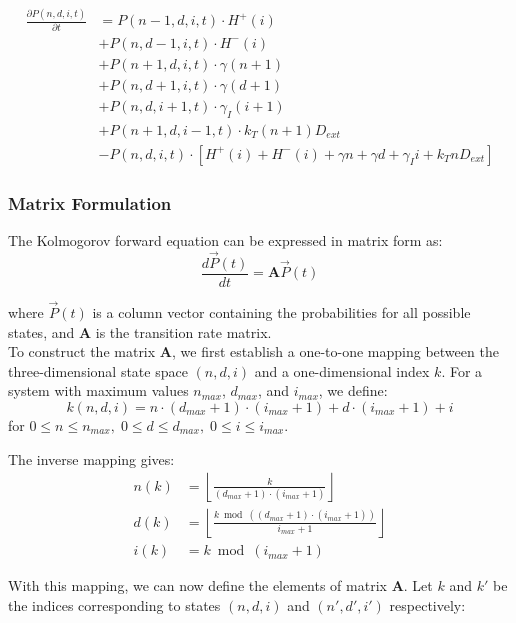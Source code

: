 \documentclass{article}
\begin{document}
\begin{flushleft}
\begin{align*}
\frac{\partial P(n,d,i,t)}{\partial t} &= P(n-1,d,i,t) \cdot H^+(i) \\
&+ P(n,d-1,i,t) \cdot H^-(i) \\
&+ P(n+1,d,i,t) \cdot \gamma(n+1) \\
&+ P(n,d+1,i,t) \cdot \gamma(d+1) \\
&+ P(n,d,i+1,t) \cdot \gamma_I(i+1) \\
&+ P(n+1,d,i-1,t) \cdot k_T(n+1)D_{ext} \\
&- P(n,d,i,t) \cdot [H^+(i) + H^-(i) + \gamma n + \gamma d + \gamma_I i + k_T n D_{ext}]
\end{align*}

\subsubsection{Matrix Formulation}
The Kolmogorov forward equation can be expressed in matrix form as:
\[
\frac{d\vec{P}(t)}{dt} = \mathbf{A} \vec{P}(t)
\]

where $\vec{P}(t)$ is a column vector containing the probabilities for all possible states, and $\mathbf{A}$ is the transition rate matrix. \\

To construct the matrix $\mathbf{A}$, we first establish a one-to-one mapping between the three-dimensional state space $(n,d,i)$ and a one-dimensional index $k$. For a system with maximum values $n_{max}$, $d_{max}$, and $i_{max}$, we define:
\[
k(n,d,i) = n \cdot (d_{max}+1) \cdot (i_{max}+1) + d \cdot (i_{max}+1) + i
\]
for $0 \leq n \leq n_{max}, \; 0 \leq d \leq d_{max}, \; 0 \leq i \leq i_{max}$.

The inverse mapping gives:
\begin{align*}
n(k) &= \left\lfloor \frac{k}{(d_{max}+1) \cdot (i_{max}+1)} \right\rfloor \\
d(k) &= \left\lfloor \frac{k \bmod ((d_{max}+1) \cdot (i_{max}+1))}{i_{max}+1} \right\rfloor \\
i(k) &= k \bmod (i_{max}+1)
\end{align*}

With this mapping, we can now define the elements of matrix $\mathbf{A}$. Let $k$ and $k'$ be the indices corresponding to states $(n,d,i)$ and $(n',d',i')$ respectively:


\end{flushleft}
\end{document}
